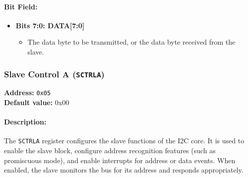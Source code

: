 \paragraph{Bit Field:}
\begin{itemize}[leftmargin=*,itemsep=2mm]
  \item \textbf{Bits 7:0: DATA[7:0]}  
        \begin{itemize}
          \item The data byte to be transmitted, or the data byte received from the slave.
        \end{itemize}
\end{itemize}

\vspace{2mm}

\subsubsection{Slave Control A (\texttt{SCTRLA})}
\label{sec:sctrla}

\textbf{Address:} \texttt{0x05} \\
\textbf{Default value:} 0x00

\paragraph{Description:}  
The \texttt{SCTRLA} register configures the slave functions of the I2C core. It is used to enable the slave block,
configure address recognition features (such as promiscuous mode), and enable interrupts for address or data events.
When enabled, the slave monitors the bus for its address and responds appropriately.

